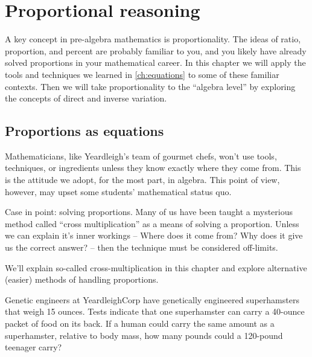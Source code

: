 \chapter{Proportional reasoning}
\label{ch:proportions}


A key concept in pre-algebra mathematics is proportionality. The ideas of ratio, proportion, and percent are probably familiar to you, and you likely have already solved proportions in your mathematical career. In this chapter we will apply the tools and techniques we learned in \cref{ch:equations} to some of these familiar contexts. Then we will take proportionality to the ``algebra level'' by exploring the concepts of direct and inverse variation.

\section{Proportions as equations}
\label{sec:propsaseqs}

Mathematicians, like Yeardleigh's team of gourmet chefs, won't use tools, techniques, or ingredients unless they know exactly where they come from. This is the attitude we adopt, for the most part, in algebra. This point of view, however, may upset some students' mathematical status quo.

Case in point: solving proportions. Many of us have been taught a mysterious method called ``cross multiplication'' as a means of solving a proportion. Unless we can explain it's inner workings -- Where does it come from? Why does it give us the correct answer? -- then the technique must be considered off-limits.

We'll explain so-called cross-multiplication in this chapter and explore alternative (easier) methods of handling proportions.


\begin{boxexplore}
Genetic engineers at YeardleighCorp have genetically engineered superhamsters that weigh 15 ounces. Tests indicate that one superhamster can carry a 40-ounce packet of food on its back. If a human could carry the same amount as a superhamster, relative to body mass, how many pounds could a 120-pound teenager carry?
\end{boxexplore}

